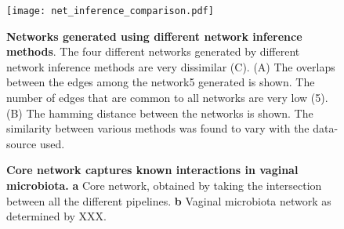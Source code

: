   \begin{figure}[h]
    \begin{center}
      \texttt{[image: net\_inference\_comparison.pdf]}
      \caption{
        \textbf{Networks generated using different network inference methods}.
        The four different networks generated by different network inference methods are very dissimilar (C).
        (A) The overlaps between the edges among the network5 generated is shown. The number of edges that are common to all networks are very low (5).
        (B) The hamming distance between the networks is shown. The similarity between various methods was found to vary with the data-source used.
      }
      \label{fig:network_comparison}
    \end{center}
  \end{figure}


  \begin{figure}[h]
    \begin{center}
      \caption{\textbf{Core network captures known interactions in vaginal microbiota.} \textbf{a} Core network, obtained by taking the intersection between all the different pipelines. \textbf{b} Vaginal microbiota network as determined by XXX.}
      \label{fig:real_network}
    \end{center}
  \end{figure}
